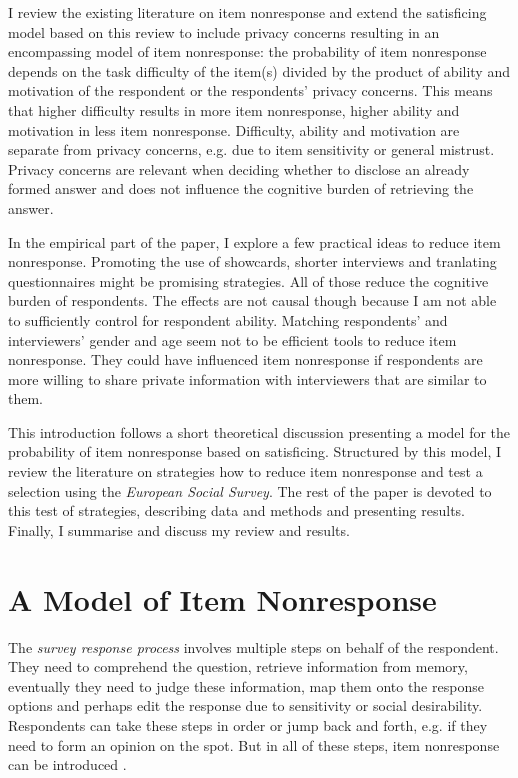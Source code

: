 \documentclass[a4paper,12pt]{article}
\begin{document}
I review the existing literature on item nonresponse and extend the satisficing model based on this review to include privacy concerns resulting in an encompassing model of item nonresponse: the probability of item nonresponse depends on the task difficulty of the item(s) divided by the product of ability and motivation of the respondent or the respondents' privacy concerns. This means that higher difficulty results in more item nonresponse, higher ability and motivation in less item nonresponse. Difficulty, ability and motivation are separate from privacy concerns, e.g. due to item sensitivity or general mistrust. Privacy concerns are relevant when deciding whether to disclose an already formed answer and does not influence the cognitive burden of retrieving the answer.

In the empirical part of the paper, I explore a few practical ideas to reduce item nonresponse. Promoting the use of showcards, shorter interviews and tranlating questionnaires might be promising strategies. All of those reduce the cognitive burden of respondents. The effects are not causal though because I am not able to sufficiently control for respondent ability. Matching respondents' and interviewers' gender and age seem not to be efficient tools to reduce item nonresponse. They could have influenced item nonresponse if respondents are more willing to share private information with interviewers that are similar to them.

This introduction follows a short theoretical discussion presenting a model for the probability of item nonresponse based on satisficing. Structured by this model, I review the literature on strategies how to reduce item nonresponse and test a selection using the \textit{European Social Survey}. The rest of the paper is devoted to this test of strategies, describing data and methods and presenting results. Finally, I summarise and discuss my review and results.


\section{A Model of Item Nonresponse}

The \textit{survey response process} \citep{tourangeauPsychologySurveyResponse2000} involves multiple steps on behalf of the respondent. They need to comprehend the question, retrieve information from memory, eventually they need to judge these information, map them onto the response options and perhaps edit the response due to sensitivity or social desirability. Respondents can take these steps in order or jump back and forth, e.g. if they need to form an opinion on the spot. But in all of these steps, item nonresponse can be introduced \citep{deleeuwPreventionTreatmentItem2003}.
\end{document}
